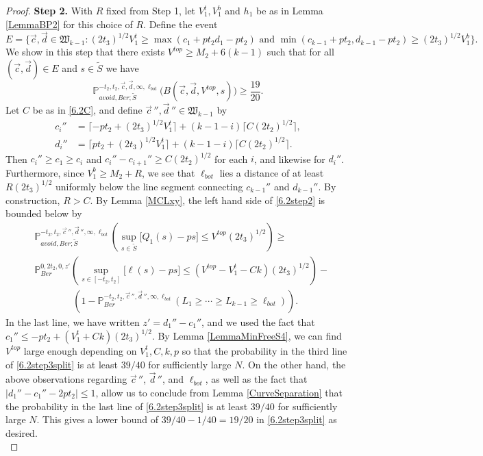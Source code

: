 \begin{proof}
	{\bf \raggedleft Step 2.} With $R$ fixed from Step 1, let $V_1^t, V_1^b$ and $h_1$ be as in Lemma \ref{LemmaBP2}  for this choice of $R$. Define the event
	$$E = \{ \vec{c}, \vec{d} \in \mathfrak{W}_{k-1}: (2t_3)^{1/2} V_1^t \geq \max(c_1 + p t_2 d_1 - pt_2) \mbox{ and }\min(c_{k-1} + p t_2, d_{k-1} - pt_2)  \geq (2t_3)^{1/2} V_1^b \}.$$
	We show in this step that there exists $V^{top} \geq M_2 + 6(k-1)$ such that for all $(\vec{c}, \vec{d}) \in E$ and $s\in\tilde{S}$ we have
	\begin{equation}\label{6.2step2}
	\mathbb{P}^{-t_2,t_2,\vec{c},\vec{d},\infty,\ell_{bot}}_{avoid,Ber;\tilde S}\big(B(\vec{c},\vec{d},V^{top},s)\big) \geq  \frac{19}{20}.
	\end{equation}
	Let $C$ be as in \eqref{6.2C}, and define $\vec{c}\,'', \vec{d}\,'' \in \mathfrak{W}_{k-1}$ by
	\begin{align*}
	c_i'' &= \lceil -pt_2 + (2t_3)^{1/2} V_1^t\rceil + (k-1-i)\lceil C(2t_2)^{1/2}\rceil,\\
	d_i'' &= \lceil pt_2 + (2t_3)^{1/2} V_1^t\rceil + (k-1-i)\lceil C(2t_2)^{1/2}\rceil.
	\end{align*}
	Then $c_i'' \geq c_1 \geq c_i$ and $c_i'' - c_{i+1}'' \geq C(2t_2)^{1/2}$ for each $i$, and likewise for $d_i''$. Furthermore, since $V_1^b \geq M_2+R$, we see that $\ell_{bot}$ lies a distance of at least $R(2t_3)^{1/2}$ uniformly below the line segment connecting $c_{k-1}''$ and $d_{k-1}''$. By construction, $R>C$. By Lemma \ref{MCLxy}, the left hand side of \eqref{6.2step2} is bounded below by
	\begin{equation}\label{6.2step3split}
	\begin{split}
	&\mathbb{P}^{-t_2,t_2,\vec{c}\,'', \vec{d}\,'', \infty,\ell_{bot}}_{avoid, Ber;\tilde S}\left(\sup_{s\in \tilde S}\big[Q_1(s) - ps\big] \leq V^{top}(2t_3)^{1/2}\right) \geq\\
	& \mathbb{P}^{0,2t_2,0,z'}_{Ber}\left(\sup_{s\in[-t_2,t_2]}\big[\ell(s) - ps\big] \leq (V^{top}-V_1^t-Ck)(2t_3)^{1/2}\right) -\\ &\qquad\qquad \left(1 - \mathbb{P}^{-t_2,t_2,\vec{c}\,'', \vec{d}\,'', \infty,\ell_{bot}}_{Ber}\left(L_1\geq\cdots\geq L_{k-1}\geq \ell_{bot}\right)\right).
	\end{split}
	\end{equation}
	In the last line, we have written $z' = d_1'' - c_1''$, and we used the fact that $c_1'' \leq -pt_2 + (V_1^t + Ck)(2t_3)^{1/2}$. By Lemma \ref{LemmaMinFreeS4}, we can find $V^{top}$ large enough depending on $V_1^t,C,k,p$ so that the probability in the third line of \eqref{6.2step3split} is at least $39/40$ for sufficiently large $N$. On the other hand, the above observations regarding $\vec{c}\,''$, $\vec{d}\,''$, and $\ell_{bot}$, as well as the fact that $|d_1'' - c_1'' - 2pt_2| \leq 1$, allow us to conclude from Lemma \ref{CurveSeparation} that the probability in the last line of \eqref{6.2step3split} is at least $39/40$ for sufficiently large $N$. This gives a lower bound of $39/40 - 1/40 = 19/20$ in \eqref{6.2step3split} as desired.\\
	

\end{proof}
